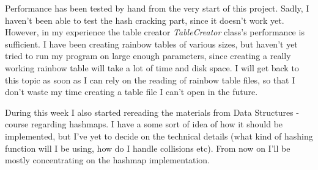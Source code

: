 \documentclass[a4paper, 11pt, finnish]{article}
\begin{document}
Performance has been tested by hand from the very start of this project. Sadly, I haven't been able to test the hash cracking part, since it doesn't work yet. However, in my experience the table creator \emph{TableCreator} class's performance is sufficient. I have been creating rainbow tables of various sizes, but haven't yet tried to run my program on large enough parameters, since creating a really working rainbow table will take a lot of time and disk space. I will get back to this topic as soon as I can rely on the reading of rainbow table files, so that I don't waste my time creating a table file I can't open in the future.

During this week I also started rereading the materials from Data Structures -course regarding hashmaps. I have a some sort of idea of how it should be implemented, but I've yet to decide on the technical details (what kind of hashing function will I be using, how do I handle collisions etc). From now on I'll be mostly concentrating on the hashmap implementation.
\end{document}
